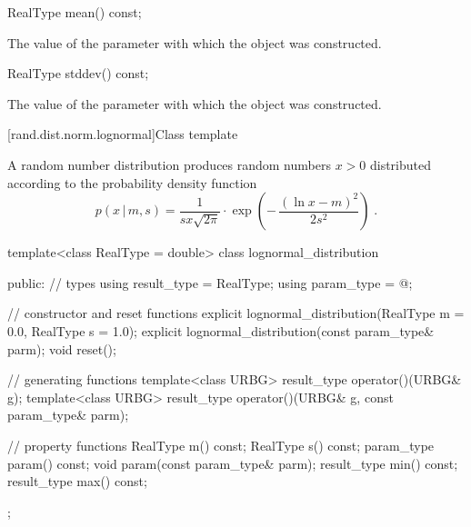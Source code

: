 %
\begin{itemdecl}
RealType mean() const;
\end{itemdecl}

\begin{itemdescr}
\pnum\returns The value of the  parameter
 with which the object was constructed.
\end{itemdescr}

%
\begin{itemdecl}
RealType stddev() const;
\end{itemdecl}

\begin{itemdescr}
\pnum\returns The value of the  parameter
 with which the object was constructed.
\end{itemdescr}


[rand.dist.norm.lognormal]{Class template }%
%
%

\pnum
A  random number distribution
produces random numbers $ x > 0 $
distributed according to
the probability density function%
%
%
\[%
 p(x\,|\,m,s)
      = \frac{1}
             {s x \sqrt{2 \pi}}
        \cdot
        \exp{\left(- \, \frac{(\ln{x} - m)^2}
                             {2 s^2}
             \right)
            }
\; \mbox{.}
\]

%
\begin{codeblock}
template<class RealType = double>
  class lognormal_distribution {
  public:
    // types
    using result_type = RealType;
    using param_type  = @\unspec@;

    // constructor and reset functions
    explicit lognormal_distribution(RealType m = 0.0, RealType s = 1.0);
    explicit lognormal_distribution(const param_type& parm);
    void reset();

    // generating functions
    template<class URBG>
      result_type operator()(URBG& g);
    template<class URBG>
      result_type operator()(URBG& g, const param_type& parm);

    // property functions
    RealType m() const;
    RealType s() const;
    param_type param() const;
    void param(const param_type& parm);
    result_type min() const;
    result_type max() const;
  };
\end{codeblock}


